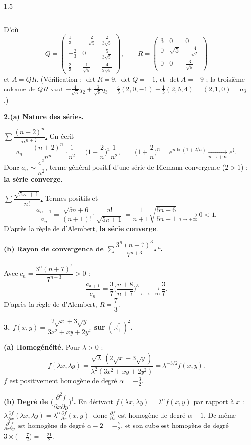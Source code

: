 \documentclass[12pt]{article}
\begin{document}
\begin{spacing}{1.5}
\begin{itemize}
\[\]
\end{itemize}
D'où
\[
\boxed{Q=\begin{pmatrix}
\frac13 & -\frac2{\sqrt5} & \frac{2}{3\sqrt5}\\[1mm]
-\frac23 & 0 & \frac{5}{3\sqrt5}\\[1mm]
\frac23 & \frac1{\sqrt5} & \frac{4}{3\sqrt5}
\end{pmatrix},\qquad
R=\begin{pmatrix}
3 & 0 & 0\\
0 & \sqrt5 & -\frac4{\sqrt5}\\[1mm]
0 & 0 & \frac3{\sqrt5}
\end{pmatrix}}
\]
et $A=QR$. (Vérification : $\det R=9$, $\det Q=-1$, et $\det A=-9$ ; la troisième colonne de $QR$ vaut $-\frac4{\sqrt5}q_2+\frac3{\sqrt5}q_3=\frac45(2,0,-1)+\frac15(2,5,4)=(2,1,0)=a_3$.)

\textbf{2.(a) Nature des séries.}

\underline{$\sum\dfrac{(n+2)^n}{n^{n+2}}$.} On écrit
\[
a_n=\frac{(n+2)^n}{n^n}\cdot\frac1{n^2}=\Big(1+\frac2n\Big)^n\frac1{n^2},\qquad\Big(1+\frac2n\Big)^n=e^{n\ln(1+2/n)}\xrightarrow[n\to+\infty]{}e^2 .
\]
Donc $a_n\sim\dfrac{e^2}{n^2}$, terme général positif d'une série de Riemann convergente ($2>1$) : \textbf{la série converge}.


\underline{$\sum\dfrac{\sqrt{5n+1}}{n!}$.} Termes positifs et
\[
\frac{a_{n+1}}{a_n}=\frac{\sqrt{5n+6}}{(n+1)!}\cdot\frac{n!}{\sqrt{5n+1}}=\frac{1}{n+1}\sqrt{\frac{5n+6}{5n+1}}\xrightarrow[n\to+\infty]{}0<1 .
\]
D'après la règle de d'Alembert, \textbf{la série converge}.

\textbf{(b) Rayon de convergence de $\sum\dfrac{3^n(n+7)^3}{7^{n+3}}x^n$.}

Avec $c_n=\dfrac{3^n(n+7)^3}{7^{n+3}}>0$ :
\[
\frac{c_{n+1}}{c_n}=\frac37\Big(\frac{n+8}{n+7}\Big)^3\xrightarrow[n\to+\infty]{}\frac37 .
\]
D'après la règle de d'Alembert, $\boxed{R=\dfrac73}$.

\textbf{3. $f(x,y)=\dfrac{2\sqrt x+3\sqrt y}{3x^2+xy+2y^2}$ sur $(\mathbb{R}_+^*)^2$.}

\textbf{(a) Homogénéité.} Pour $\lambda>0$ :
\[
f(\lambda x,\lambda y)=\frac{\sqrt\lambda\,(2\sqrt x+3\sqrt y)}{\lambda^2(3x^2+xy+2y^2)}=\lambda^{-3/2}f(x,y).
\]
$f$ est positivement homogène de degré $\boxed{\alpha=-\frac32}$.

\textbf{(b) Degré de $\Big(\dfrac{\partial^2f}{\partial x\partial y}\Big)^3$.} En dérivant $f(\lambda x,\lambda y)=\lambda^\alpha f(x,y)$ par rapport à $x$ : $\lambda\frac{\partial f}{\partial x}(\lambda x,\lambda y)=\lambda^\alpha\frac{\partial f}{\partial x}(x,y)$, donc $\frac{\partial f}{\partial x}$ est homogène de degré $\alpha-1$. De même $\frac{\partial^2f}{\partial x\partial y}$ est homogène de degré $\alpha-2=-\frac72$, et son cube est homogène de degré $3\times\big(-\frac72\big)=\boxed{-\frac{21}{2}}$.


\end{spacing}
\end{document}
